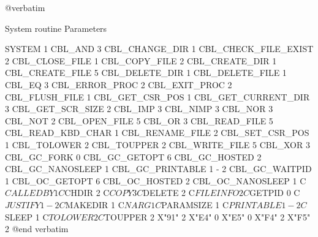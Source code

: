 @verbatim


System routine                  Parameters

SYSTEM                          1
CBL_AND                         3
CBL_CHANGE_DIR                  1
CBL_CHECK_FILE_EXIST            2
CBL_CLOSE_FILE                  1
CBL_COPY_FILE                   2
CBL_CREATE_DIR                  1
CBL_CREATE_FILE                 5
CBL_DELETE_DIR                  1
CBL_DELETE_FILE                 1
CBL_EQ                          3
CBL_ERROR_PROC                  2
CBL_EXIT_PROC                   2
CBL_FLUSH_FILE                  1
CBL_GET_CSR_POS                 1
CBL_GET_CURRENT_DIR             3
CBL_GET_SCR_SIZE                2
CBL_IMP                         3
CBL_NIMP                        3
CBL_NOR                         3
CBL_NOT                         2
CBL_OPEN_FILE                   5
CBL_OR                          3
CBL_READ_FILE                   5
CBL_READ_KBD_CHAR               1
CBL_RENAME_FILE                 2
CBL_SET_CSR_POS                 1
CBL_TOLOWER                     2
CBL_TOUPPER                     2
CBL_WRITE_FILE                  5
CBL_XOR                         3
CBL_GC_FORK                     0
CBL_GC_GETOPT                   6
CBL_GC_HOSTED                   2
CBL_GC_NANOSLEEP                1
CBL_GC_PRINTABLE                1 - 2
CBL_GC_WAITPID                  1
CBL_OC_GETOPT                   6
CBL_OC_HOSTED                   2
CBL_OC_NANOSLEEP                1
C$CALLEDBY                      1
C$CHDIR                         2
C$COPY                          3
C$DELETE                        2
C$FILEINFO                      2
C$GETPID                        0
C$JUSTIFY                       1 - 2
C$MAKEDIR                       1
C$NARG                          1
C$PARAMSIZE                     1
C$PRINTABLE                     1 - 2
C$SLEEP                         1
C$TOLOWER                       2
C$TOUPPER                       2
X"91"                           2
X"E4"                           0
X"E5"                           0
X"F4"                           2
X"F5"                           2
@end verbatim
